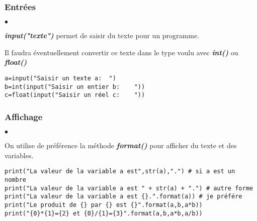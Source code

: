 \documentclass[10pt,dvipsnames,  dvips]{article}
\begin{document}
\subsubsection*{Entrées}


\begin{minipage}[t]{9cm}
\begin{list}{$\bullet$}{}
\item \textbf{\textit{input("texte")}} permet de saisir du texte pour un programme.
\item Il faudra éventuellement convertir ce texte dans le type voulu avec \textbf{\textit{int()}} ou \textbf{\textit{float()}}
\end{list}
\end{minipage}
\hspace{0.5cm}
\begin{minipage}[t]{8cm}
\lstset{ style=PYTHON}
\begin{lstlisting}
a=input("Saisir un texte a:  ")
b=int(input("Saisir un entier b:    "))
c=float(input("Saisir un réel c:    "))
\end{lstlisting}
\end{minipage}


\subsubsection*{Affichage}

\begin{list}{$\bullet$}{}
\item On utilise de préférence la méthode \textbf{\textit{format()}} pour afficher du texte et des variables.
\end{list}

\begin{lstlisting}
print("La valeur de la variable a est",str(a),".") # si a est un nombre
print("La valeur de la variable a est " + str(a) + ".") # autre forme
print("La valeur de la variable a est {}.".format(a)) # je préfére
print("Le produit de {} par {} est {}".format(a,b,a*b))
print("{0}*{1}={2} et {0}/{1}={3}".format(a,b,a*b,a/b))
\end{lstlisting}
\end{document}
